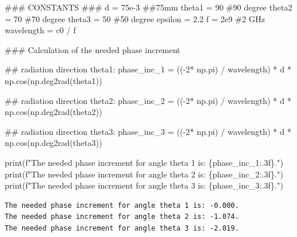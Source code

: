 \documentclass[
  letterpaper,
  DIV=11,
  numbers=noendperiod]{scrartcl}
\newenvironment{Shaded}{\begin{snugshade}}{\end{snugshade}}
\newcommand{\AlertTok}[1]{\textcolor[rgb]{0.68,0.00,0.00}{#1}}
\newcommand{\BuiltInTok}[1]{\textcolor[rgb]{0.00,0.23,0.31}{#1}}
\newcommand{\CommentTok}[1]{\textcolor[rgb]{0.37,0.37,0.37}{#1}}
\newcommand{\DecValTok}[1]{\textcolor[rgb]{0.68,0.00,0.00}{#1}}
\newcommand{\FloatTok}[1]{\textcolor[rgb]{0.68,0.00,0.00}{#1}}
\newcommand{\NormalTok}[1]{\textcolor[rgb]{0.00,0.23,0.31}{#1}}
\newcommand{\OperatorTok}[1]{\textcolor[rgb]{0.37,0.37,0.37}{#1}}
\newcommand{\SpecialCharTok}[1]{\textcolor[rgb]{0.37,0.37,0.37}{#1}}
\newcommand{\SpecialStringTok}[1]{\textcolor[rgb]{0.13,0.47,0.30}{#1}}
\begin{document}
\begin{Shaded}
\begin{Highlighting}[]
\CommentTok{\#\#\# CONSTANTS }\AlertTok{\#\#\#}
\NormalTok{d }\OperatorTok{=} \FloatTok{75e{-}3} \CommentTok{\#\#75mm}
\NormalTok{theta1 }\OperatorTok{=} \DecValTok{90} \CommentTok{\#90 degree}
\NormalTok{theta2 }\OperatorTok{=} \DecValTok{70} \CommentTok{\#70 degree}
\NormalTok{theta3 }\OperatorTok{=} \DecValTok{50} \CommentTok{\#50 degree}
\NormalTok{epsilon }\OperatorTok{=} \FloatTok{2.2}
\NormalTok{f }\OperatorTok{=} \FloatTok{2e9} \CommentTok{\#2 GHz}
\NormalTok{wavelength }\OperatorTok{=}\NormalTok{ c0 }\OperatorTok{/}\NormalTok{ f}


\CommentTok{\#\#\# Calculation of the needed phase increment}

\CommentTok{\#\# radiation direction theta1: }
\NormalTok{phase\_inc\_1 }\OperatorTok{=}\NormalTok{ ((}\OperatorTok{{-}}\DecValTok{2}\OperatorTok{*}\NormalTok{ np.pi) }\OperatorTok{/}\NormalTok{ wavelength) }\OperatorTok{*}\NormalTok{ d }\OperatorTok{*}\NormalTok{ np.cos(np.deg2rad(theta1))}

\CommentTok{\#\# radiation direction theta2: }
\NormalTok{phase\_inc\_2 }\OperatorTok{=}\NormalTok{ ((}\OperatorTok{{-}}\DecValTok{2}\OperatorTok{*}\NormalTok{ np.pi) }\OperatorTok{/}\NormalTok{ wavelength) }\OperatorTok{*}\NormalTok{ d }\OperatorTok{*}\NormalTok{ np.cos(np.deg2rad(theta2))}

\CommentTok{\#\# radiation direction theta3: }
\NormalTok{phase\_inc\_3 }\OperatorTok{=}\NormalTok{ ((}\OperatorTok{{-}}\DecValTok{2}\OperatorTok{*}\NormalTok{ np.pi) }\OperatorTok{/}\NormalTok{ wavelength) }\OperatorTok{*}\NormalTok{ d }\OperatorTok{*}\NormalTok{ np.cos(np.deg2rad(theta3))}

\BuiltInTok{print}\NormalTok{(}\SpecialStringTok{f"The needed phase increment for angle theta 1 is: }\SpecialCharTok{\{}\NormalTok{phase\_inc\_1}\SpecialCharTok{:.3f\}}\SpecialStringTok{."}\NormalTok{)}
\BuiltInTok{print}\NormalTok{(}\SpecialStringTok{f"The needed phase increment for angle theta 2 is: }\SpecialCharTok{\{}\NormalTok{phase\_inc\_2}\SpecialCharTok{:.3f\}}\SpecialStringTok{."}\NormalTok{)}
\BuiltInTok{print}\NormalTok{(}\SpecialStringTok{f"The needed phase increment for angle theta 3 is: }\SpecialCharTok{\{}\NormalTok{phase\_inc\_3}\SpecialCharTok{:.3f\}}\SpecialStringTok{."}\NormalTok{)}
\end{Highlighting}
\end{Shaded}

\begin{verbatim}
The needed phase increment for angle theta 1 is: -0.000.
The needed phase increment for angle theta 2 is: -1.074.
The needed phase increment for angle theta 3 is: -2.019.
\end{verbatim}
\end{document}
